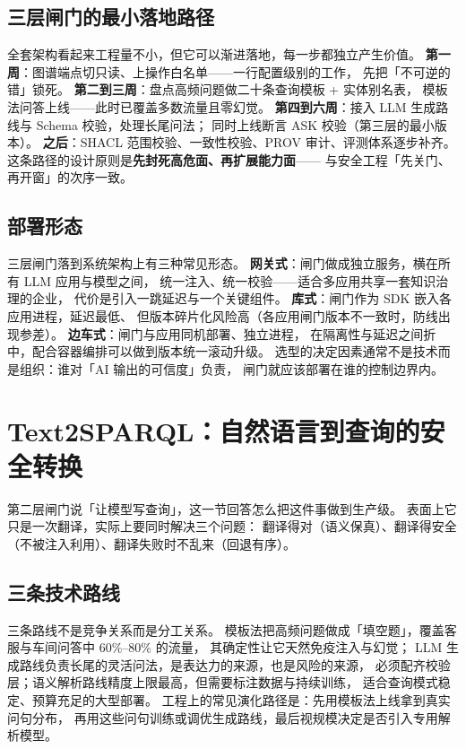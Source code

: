 \subsection{三层闸门的最小落地路径}

全套架构看起来工程量不小，但它可以渐进落地，每一步都独立产生价值。
\textbf{第一周}：图谱端点切只读、上操作白名单——一行配置级别的工作，
先把「不可逆的错」锁死。
\textbf{第二到三周}：盘点高频问题做二十条查询模板 + 实体别名表，
模板法问答上线——此时已覆盖多数流量且零幻觉。
\textbf{第四到六周}：接入 LLM 生成路线与 Schema 校验，处理长尾问法；
同时上线断言 ASK 校验（第三层的最小版本）。
\textbf{之后}：SHACL 范围校验、一致性校验、PROV 审计、评测体系逐步补齐。
这条路径的设计原则是\textbf{先封死高危面、再扩展能力面}——
与安全工程「先关门、再开窗」的次序一致。

\subsection{部署形态}

三层闸门落到系统架构上有三种常见形态。
\textbf{网关式}：闸门做成独立服务，横在所有 LLM 应用与模型之间，
统一注入、统一校验——适合多应用共享一套知识治理的企业，
代价是引入一跳延迟与一个关键组件。
\textbf{库式}：闸门作为 SDK 嵌入各应用进程，延迟最低、
但版本碎片化风险高（各应用闸门版本不一致时，防线出现参差）。
\textbf{边车式}：闸门与应用同机部署、独立进程，
在隔离性与延迟之间折中，配合容器编排可以做到版本统一滚动升级。
选型的决定因素通常不是技术而是组织：谁对「AI 输出的可信度」负责，
闸门就应该部署在谁的控制边界内。

\section{Text2SPARQL：自然语言到查询的安全转换}

第二层闸门说「让模型写查询」，这一节回答怎么把这件事做到生产级。
表面上它只是一次翻译，实际上要同时解决三个问题：
翻译得对（语义保真）、翻译得安全（不被注入利用）、翻译失败时不乱来（回退有序）。

\subsection{三条技术路线}



三条路线不是竞争关系而是分工关系。
模板法把高频问题做成「填空题」，覆盖客服与车间问答中 60\%--80\% 的流量，
其确定性让它天然免疫注入与幻觉；
LLM 生成路线负责长尾的灵活问法，是表达力的来源，也是风险的来源，
必须配齐校验层；语义解析路线精度上限最高，但需要标注数据与持续训练，
适合查询模式稳定、预算充足的大型部署。
工程上的常见演化路径是：先用模板法上线拿到真实问句分布，
再用这些问句训练或调优生成路线，最后视规模决定是否引入专用解析模型。

